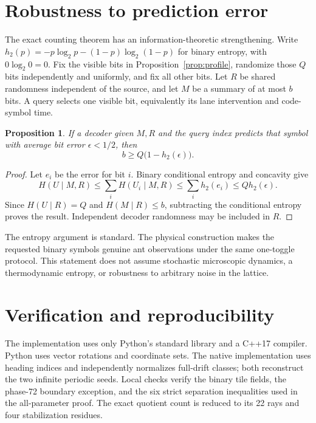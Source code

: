 \documentclass[11pt]{article}
\newtheorem{proposition}[theorem]{Proposition}
\theoremstyle{definition}\newtheorem{definition}[theorem]{Definition}
\begin{document}
\section{Robustness to prediction error}
The exact counting theorem has an information-theoretic strengthening.
Write $h_2(p)=-p\log_2p-(1-p)\log_2(1-p)$ for binary entropy, with
$0\log_2 0=0$.
Fix the visible bits in Proposition~\ref{prop:profile}, randomize those $Q$ bits
independently and uniformly, and fix all other bits. Let $R$ be shared randomness
independent of the source, and let $M$ be a summary of at most $b$ bits. A query
selects one visible bit, equivalently its lane intervention and code-symbol time.

\begin{proposition}\label{prop:error}
If a decoder given $M,R$ and the query index predicts that symbol with average
bit error $\epsilon<1/2$, then
\[
b\ge Q\bigl(1-h_2(\epsilon)\bigr).
\]
\end{proposition}
\begin{proof}
Let $e_i$ be the error for bit $i$. Binary conditional entropy and concavity give
\[
H(U\mid M,R)\le\sum_i H(U_i\mid M,R)
\le\sum_i h_2(e_i)\le Qh_2(\epsilon).
\]
Since $H(U\mid R)=Q$ and $H(M\mid R)\le b$, subtracting the conditional entropy
proves the result. Independent decoder randomness may be included in $R$.
\end{proof}

The entropy argument is standard. The physical construction makes the requested
binary symbols genuine ant observations under the same one-toggle protocol.
This statement does not assume stochastic microscopic dynamics, a thermodynamic
entropy, or robustness to arbitrary noise in the lattice.

\section{Verification and reproducibility}\label{sec:verification}
The implementation uses only Python's standard library and a C++17 compiler.
Python uses vector rotations and coordinate sets. The native implementation uses
heading indices and independently normalizes full-drift classes; both reconstruct
the two infinite periodic seeds. Local checks verify the binary tile fields,
the phase-72 boundary exception, and the six strict separation inequalities used
in the all-parameter proof. The exact quotient count is reduced to its 22 rays
and four stabilization residues.
\end{document}
